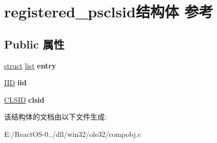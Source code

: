 \hypertarget{structregistered__psclsid}{}\section{registered\+\_\+psclsid结构体 参考}
\label{structregistered__psclsid}
\subsection*{Public 属性}
\begin{DoxyCompactItemize}
\item 
\mbox{\label{structregistered__psclsid_aabee442f292b08c504301789da4b630e}} 
\hyperlink{interfacestruct}{struct} \hyperlink{classlist}{list} {\bfseries entry}
\item 
\mbox{\label{structregistered__psclsid_af8b5203430a35b3609c93698ffe13633}} 
\hyperlink{struct___i_i_d}{I\+ID} {\bfseries iid}
\item 
\mbox{\label{structregistered__psclsid_a1a10f07b9f1e7a9423d546f5d06560fe}} 
\hyperlink{struct___i_i_d}{C\+L\+S\+ID} {\bfseries clsid}
\end{DoxyCompactItemize}


该结构体的文档由以下文件生成\+:\begin{DoxyCompactItemize}
\item 
E\+:/\+React\+O\+S-\/0../dll/win32/ole32/compobj.\+c\end{DoxyCompactItemize}
